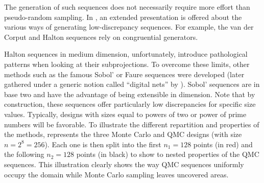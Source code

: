 
The generation of such sequences does not necessarily require more effort than pseudo-random sampling. 
In \citet[Chap. 15]{owen_2013}, an extended presentation is offered about the various ways of generating low-discrepancy sequences. 
For example, the van der Corput and Halton sequences rely on congruential generators. 

Halton sequences in medium dimension, unfortunately, introduce pathological patterns when looking at their subprojections. 
To overcome these limits, other methods such as the famous Sobol' or Faure sequences were developed (later gathered under a generic notion called ``digital nets'' by \citealp{dick_2010_digital_nets}).  
Sobol' sequences are in base two and have the advantage of being extensible in dimension. 
Note that by construction, these sequences offer particularly low discrepancies for specific size values. 
Typically, designs with sizes equal to powers of two or power of prime numbers will be favorable. 
To illustrate the different repartition and properties of the methods,  represents the three Monte Carlo and QMC designs (with size $n=2^8=256$). 
Each one is then split into the first $n_1=128$ points (in red) and the following $n_2=128$ points (in black) to show to nested properties of the QMC sequences. 
This illustration clearly shows the way QMC sequences uniformly occupy the domain while Monte Carlo sampling leaves uncovered areas.  


